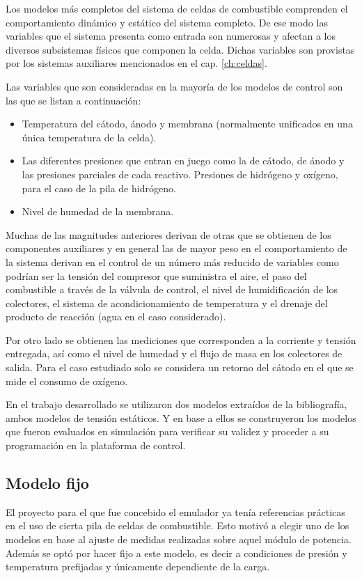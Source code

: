 Los modelos más completos del sistema de celdas de combustible comprenden el comportamiento dinámico y estático del sistema completo.
De ese modo las variables que el sistema presenta como entrada son numerosas y afectan a los diversos subsistemas físicos que componen
la celda. Dichas variables son provistas por los sistemas auxiliares mencionados en el cap. \ref{ch:celdas}.

Las variables que son consideradas en la mayoría de los modelos de control son las que se listan a continuación:

\begin{itemize}
 \item Temperatura del cátodo, ánodo y membrana (normalmente unificados en una única temperatura de la celda).
 \item Las diferentes presiones que entran en juego como la de cátodo, de ánodo y las presiones parciales de
 cada reactivo. Presiones de hidrógeno y oxígeno, para el caso de la pila de hidrógeno.
 \item Nivel de humedad de la membrana.
\end{itemize}

Muchas de las magnitudes anteriores derivan de otras que se obtienen de los componentes auxiliares y en general las de mayor peso en
el comportamiento de la sistema derivan en el control de un número más reducido de variables como podrían ser la tensión del compresor
que suministra el aire, el paso del combustible a través de la válvula de control, el nivel de humidificación de los colectores, el
sistema de acondicionamiento de temperatura y el drenaje del producto de reacción (agua en el caso considerado).

Por otro lado se obtienen las mediciones que corresponden a la corriente y tensión entregada, así como el nivel de humedad y el flujo
de masa en los colectores de salida. Para el caso estudiado solo se considera un retorno del cátodo en el que se mide el consumo de
oxígeno.

En el trabajo desarrollado se utilizaron dos modelos extraídos de la bibliografía, ambos modelos de tensión estáticos. Y en base a ellos
se construyeron los modelos que fueron evaluados en simulación para verificar su validez y proceder a su programación en la plataforma
de control.

\subsection{Modelo fijo}
\label{sub:modelo_fijo}
El proyecto para el que fue concebido el emulador ya tenía referencias prácticas en el uso de cierta pila de celdas de combustible. Esto
motivó a elegir uno de los modelos en base al ajuste de medidas realizadas sobre aquel módulo de potencia. Además se optó por hacer
fijo a este modelo, es decir a condiciones de presión y temperatura prefijadas y únicamente dependiente de la carga.


